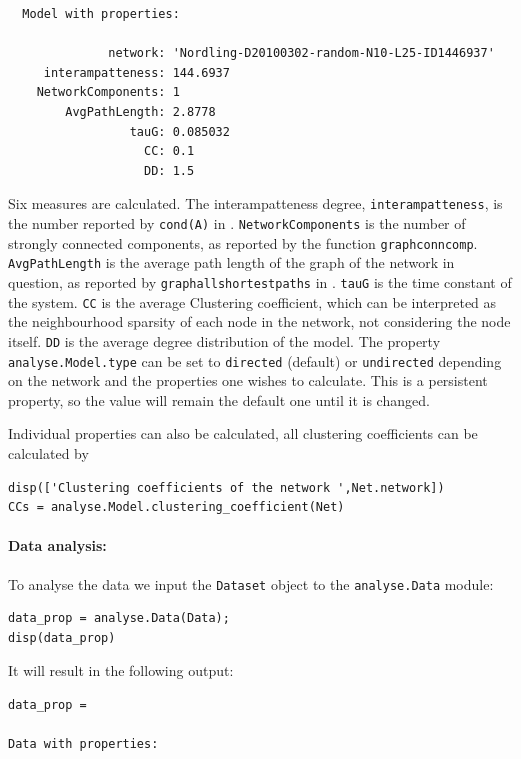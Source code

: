 \begin{bibunit}
\begin{verbatim}
  Model with properties:

              network: 'Nordling-D20100302-random-N10-L25-ID1446937'
     interampatteness: 144.6937
    NetworkComponents: 1
        AvgPathLength: 2.8778
                 tauG: 0.085032
                   CC: 0.1
                   DD: 1.5
\end{verbatim}

Six measures are calculated.
The interampatteness degree, \texttt{interampatteness}, is the number reported by
\texttt{cond(A)} in \matlab.  \texttt{NetworkComponents} is the number of
strongly connected components, as reported by the \matlab function
\texttt{graphconncomp}.  \texttt{AvgPathLength} is the average path length of
the graph of the network in question, as reported by
\texttt{graphallshortestpaths} in \matlab.  \texttt{tauG} is the time constant
of the system.  \texttt{CC} is the average Clustering coefficient, which
can be interpreted as the neighbourhood sparsity of each node in
the network, not considering the node itself. \texttt{DD} is the
average degree distribution of the model.
The property \texttt{analyse.Model.type} can be set to \texttt{directed} (default) or \texttt{undirected} depending on the network and the properties one wishes to calculate.
This is a persistent property, so the value will remain the default one until it is changed.

Individual properties can also be calculated, \eg
all clustering coefficients can be calculated by
\begin{verbatim}
disp(['Clustering coefficients of the network ',Net.network])
CCs = analyse.Model.clustering_coefficient(Net)
\end{verbatim}

\paragraph{Data analysis:}
\label{sec:data_analysis_example}
To analyse the data we input the \texttt{Dataset} object to the \texttt{analyse.Data} module:
\begin{verbatim}
data_prop = analyse.Data(Data);
disp(data_prop)
\end{verbatim}
It will result in the following output:
\begin{verbatim}
data_prop =

Data with properties:


\end{verbatim}
\end{bibunit}
